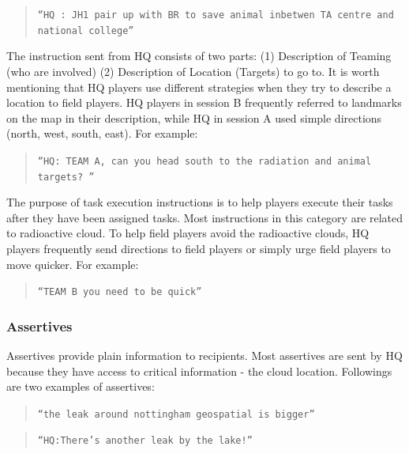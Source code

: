 \begin{quote}
\texttt{``HQ : JH1 pair up with BR to save animal inbetwen TA centre and national college''}\\
\end{quote}

The instruction sent from HQ consists of two parts: (1) Description of Teaming (who are involved) (2) Description of Location (Targets) to go to. It is worth mentioning that HQ players use different strategies when they try to describe a location to field players. HQ players in session B frequently referred to landmarks on the map in their description, while HQ in session A used simple directions (north, west, south, east). For example:\\

\begin{quote}
\texttt{``HQ: TEAM A, can you head south to the radiation and animal targets? ''} \\
\end{quote}

The purpose of task execution instructions is to help players execute their tasks after they have been assigned tasks. Most instructions in this category are related to radioactive cloud. To help field players avoid the radioactive clouds, HQ players frequently send directions to field players or simply urge field players to move quicker. For example:

\begin{quote}
\texttt{``TEAM B you need to be quick''} \\
\end{quote}

\subsubsection{Assertives}

Assertives provide plain information to recipients. Most assertives are sent by HQ because they have access to critical information - the cloud location. Followings are two examples of assertives:\\

\begin{quote}
\texttt{``the leak around nottingham geospatial is bigger''}\\
\end{quote}

\begin{quote}
\texttt{``HQ:There's another leak by the lake!''}\\
\end{quote}

